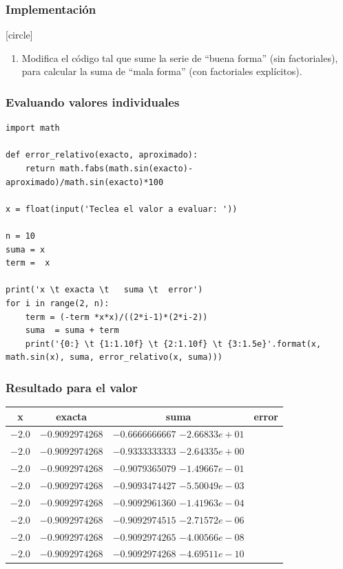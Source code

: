 \begin{frame}[fragile]
\frametitle{Implementación}
[circle]
\begin{enumerate}[<+->]
\conti   
\item Modifica el código tal que sume la serie de \enquote{buena forma} (sin factoriales), para calcular la suma de \enquote{mala forma} (con factoriales explícitos).
\end{enumerate}
\end{frame}
\begin{frame}
\frametitle{Evaluando valores individuales}
\begin{lstlisting}[style=codigopython]
import math

def error_relativo(exacto, aproximado):
    return math.fabs(math.sin(exacto)- aproximado)/math.sin(exacto)*100

x = float(input('Teclea el valor a evaluar: '))

n = 10
suma = x
term =  x

print('x \t exacta \t   suma \t  error')
for i in range(2, n):
    term = (-term *x*x)/((2*i-1)*(2*i-2))
    suma  = suma + term
    print('{0:} \t {1:1.10f} \t {2:1.10f} \t {3:1.5e}'.format(x, math.sin(x), suma, error_relativo(x, suma)))
\end{lstlisting}
\end{frame}
\begin{frame}[fragile]
\frametitle{Resultado para el valor}
\begin{table}
\fontsize{12}{12}\selectfont
\begin{tabular}{c c c c}
x & exacta & suma & error \\ \hline
$-2.0$ & $-0.9092974268$ & $-0.6666666667$  $-2.66833e+01$ \\ \hline
$-2.0$ & $-0.9092974268$ & $-0.9333333333$  $-2.64335e+00$ \\ \hline
$-2.0$ & $-0.9092974268$ & $-0.9079365079$  $-1.49667e-01$ \\ \hline
$-2.0$ & $-0.9092974268$ & $-0.9093474427$  $-5.50049e-03$ \\ \hline
$-2.0$ & $-0.9092974268$ & $-0.9092961360$  $-1.41963e-04$ \\ \hline
$-2.0$ & $-0.9092974268$ & $-0.9092974515$  $-2.71572e-06$ \\ \hline
$-2.0$ & $-0.9092974268$ & $-0.9092974265$  $-4.00566e-08$ \\ \hline
$-2.0$ & $-0.9092974268$ & $-0.9092974268$  $-4.69511e-10$ \\ \hline
\end{tabular}
\end{table}
\end{frame}
